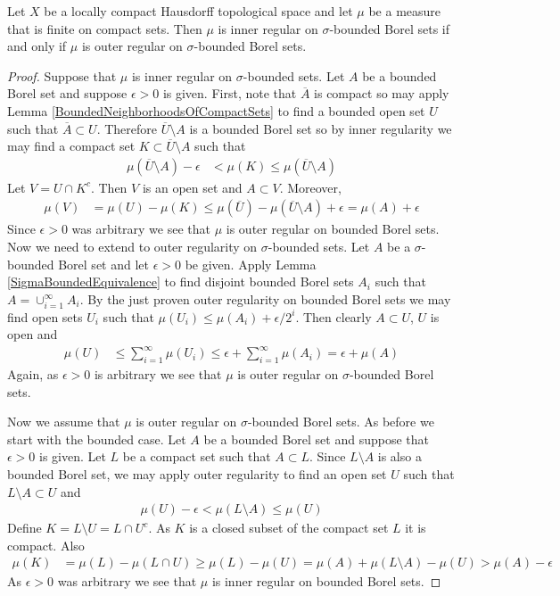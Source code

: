 \begin{lem}\label{InnerOuterRegularityEquivalence}Let $X$ be a locally compact Hausdorff topological space and let $\mu$ be a measure
  that is finite on compact sets.  Then $\mu$ is inner regular on
  $\sigma$-bounded Borel sets if and only if $\mu$ is outer regular on
  $\sigma$-bounded Borel sets.
\end{lem}
\begin{proof}
Suppose that $\mu$ is inner regular on $\sigma$-bounded sets.  Let $A$
be a bounded Borel set and suppose $\epsilon > 0$ is given.   First,
note that $\overline{A}$ is compact so may apply
Lemma \ref{BoundedNeighborhoodsOfCompactSets} to find a bounded
open set $U$ such that $\overline{A} \subset U$.  Therefore
$\overline{U} \setminus A$ is a bounded Borel set so by inner
regularity we may find a
compact set $K \subset \overline{U} \setminus A$ such that 
\begin{align*}
\mu(\overline{U} \setminus A) - \epsilon &< \mu(K) \leq \mu(\overline{U} \setminus A)
\end{align*}
Let $V = U \cap K^c$.  Then $V$ is an open set and $A \subset V$.
Moreover,
\begin{align*}
\mu(V) &= \mu(U) - \mu(K) \leq \mu(\overline{U}) - \mu(\overline{U}
\setminus A) + \epsilon = \mu(A) + \epsilon
\end{align*}
Since $\epsilon > 0$ was arbitrary we see that $\mu$ is outer regular
on bounded Borel sets.  Now we need to extend to outer regularity on
$\sigma$-bounded sets.  Let $A$ be a $\sigma$-bounded Borel set and
let $\epsilon > 0$ be given.  Apply Lemma
\ref{SigmaBoundedEquivalence}
to find disjoint bounded Borel sets $A_i$ such that $A = \cup_{i=1}^\infty
A_i$.  By the just proven outer regularity on bounded Borel sets we
may find open sets $U_i$ such that $\mu(U_i) \leq \mu(A_i) +
\epsilon/2^i$.  Then clearly $A \subset U$, $U$ is open and 
\begin{align*}
\mu(U) &\leq \sum_{i=1}^\infty \mu(U_i) \leq \epsilon + \sum_{i=1}^\infty
\mu(A_i)  = \epsilon + \mu(A)
\end{align*}
Again, as $\epsilon > 0$ is arbitrary we see that $\mu$ is outer
regular on $\sigma$-bounded Borel sets.

Now we assume that $\mu$ is outer regular on $\sigma$-bounded Borel
sets.  As before we start with the bounded case.  Let $A$ be a bounded
Borel set and suppose that $\epsilon > 0$ is given.  Let $L$ be a
compact set such that $A \subset L$.  Since $L \setminus A$ is also a
bounded Borel set, we may apply outer regularity to find an open set
$U$ such that $L \setminus A \subset U$ and 
\begin{align*}
\mu(U) - \epsilon < \mu(L \setminus A) \leq \mu(U)
\end{align*}
Define $K = L \setminus U = L \cap U^c$. As $K$ is a closed subset of the compact set $L$
it is compact.  Also
\begin{align*}
\mu(K) &= \mu(L) - \mu(L \cap U) \geq \mu(L) - \mu(U) = \mu(A) + \mu(L
\setminus A) - \mu(U) > \mu(A) - \epsilon
\end{align*}
As $\epsilon >0$ was arbitrary we see that $\mu$ is inner regular on
bounded Borel sets.  


\end{proof}
